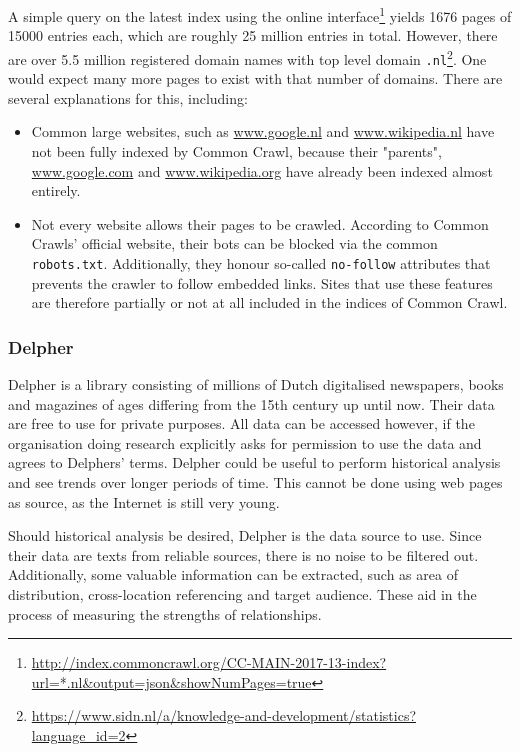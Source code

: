 A simple query on the latest index using the online interface\footnote{\url{http://index.commoncrawl.org/CC-MAIN-2017-13-index?url=*.nl&output=json&showNumPages=true}} yields 1676 pages of 15000 entries each, which are roughly 25 million entries in total. However, there are over 5.5 million registered domain names with top level domain \texttt{.nl}\footnote{\url{https://www.sidn.nl/a/knowledge-and-development/statistics?language_id=2}}. One would expect many more pages to exist with that number of domains. There are several explanations for this, including:
\begin{itemize}
\item Common large websites, such as \url{www.google.nl} and \url{www.wikipedia.nl} have not been fully indexed by Common Crawl, because their "parents", \url{www.google.com} and \url{www.wikipedia.org} have already been indexed almost entirely.
\item Not every website allows their pages to be crawled. According to Common Crawls' official website, their bots can be blocked via the common \texttt{robots.txt}. Additionally, they honour so-called \texttt{no-follow} attributes that prevents the crawler to follow embedded links. Sites that use these features are therefore partially or not at all included in the indices of Common Crawl.
\end{itemize}

\subsubsection{Delpher}
Delpher\cite{delpher} is a library consisting of millions of Dutch digitalised newspapers, books and magazines of ages differing from the 15th century up until now. Their data are free to use for private purposes. All data can be accessed however, if the organisation doing research explicitly asks for permission to use the data and agrees to Delphers' terms. Delpher could be useful to perform historical analysis and see trends over longer periods of time. This cannot be done using web pages as source, as the Internet is still very young.

Should historical analysis be desired, Delpher is the data source to use. Since their data are texts from reliable sources, there is no noise to be filtered out. Additionally, some valuable information can be extracted, such as area of distribution, cross-location referencing and target audience. These aid in the process of measuring the strengths of relationships.

